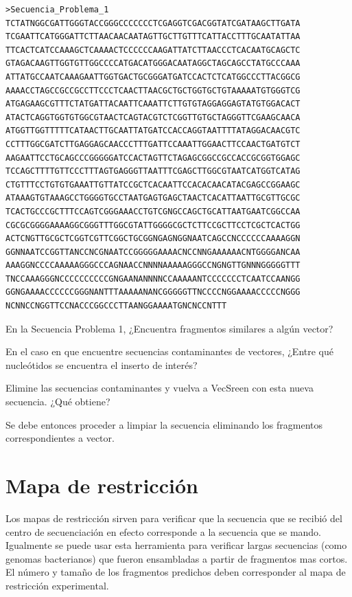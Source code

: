\documentclass[letter,11pt]{book}
\begin{document}
\begin{Verbatim}[commandchars=!\{\},numbers=none,label=Secuencia problema 1,frame=topline,fontsize=\scriptsize]
>Secuencia_Problema_1 
TCTATNGGCGATTGGGTACCGGGCCCCCCCTCGAGGTCGACGGTATCGATAAGCTTGATA
TCGAATTCATGGGATTCTTAACAACAATAGTTGCTTGTTTCATTACCTTTGCAATATTAA
TTCACTCATCCAAAGCTCAAAACTCCCCCCAAGATTATCTTAACCCTCACAATGCAGCTC
GTAGACAAGTTGGTGTTGGCCCCATGACATGGGACAATAGGCTAGCAGCCTATGCCCAAA
ATTATGCCAATCAAAGAATTGGTGACTGCGGGATGATCCACTCTCATGGCCCTTACGGCG
AAAACCTAGCCGCCGCCTTCCCTCAACTTAACGCTGCTGGTGCTGTAAAAATGTGGGTCG
ATGAGAAGCGTTTCTATGATTACAATTCAAATTCTTGTGTAGGAGGAGTATGTGGACACT
ATACTCAGGTGGTGTGGCGTAACTCAGTACGTCTCGGTTGTGCTAGGGTTCGAAGCAACA
ATGGTTGGTTTTTCATAACTTGCAATTATGATCCACCAGGTAATTTTATAGGACAACGTC
CCTTTGGCGATCTTGAGGAGCAACCCTTTGATTCCAAATTGGAACTTCCAACTGATGTCT
AAGAATTCCTGCAGCCCGGGGGATCCACTAGTTCTAGAGCGGCCGCCACCGCGGTGGAGC
TCCAGCTTTTGTTCCCTTTAGTGAGGGTTAATTTCGAGCTTGGCGTAATCATGGTCATAG
CTGTTTCCTGTGTGAAATTGTTATCCGCTCACAATTCCACACAACATACGAGCCGGAAGC
ATAAAGTGTAAAGCCTGGGGTGCCTAATGAGTGAGCTAACTCACATTAATTGCGTTGCGC
TCACTGCCCGCTTTCCAGTCGGGAAACCTGTCGNGCCAGCTGCATTAATGAATCGGCCAA
CGCGCGGGGAAAAGGCGGGTTTGGCGTATTGGGGCGCTCTTCCGCTTCCTCGCTCACTGG
ACTCNGTTGCGCTCGGTCGTTCGGCTGCGGNGAGNGGNAATCAGCCNCCCCCCAAAAGGN
GGNNAATCCGGTTANCCNCGNAATCCGGGGGAAAACNCCNNGAAAAAACNTGGGGANCAA
AAAGGNCCCCAAAAAGGGCCCAGNAACCNNNNAAAAAGGGCCNGNGTTGNNNGGGGGTTT
TNCCAAAGGGNCCCCCCCCCCGNGAANANNNNCCAAAAANTCCCCCCCTCAATCCAANGG
GGNGAAAACCCCCCGGGNANTTTAAAAANANCGGGGGTTNCCCCNGGAAAACCCCCNGGG
NCNNCCNGGTTCCNACCCGGCCCTTAANGGAAAATGNCNCCNTTT
\end{Verbatim} 

{\color{red}
En la Secuencia Problema 1, ¿Encuentra fragmentos similares a algún vector?

En el caso en que encuentre secuencias contaminantes de vectores, ¿Entre qué nucleótidos se encuentra el inserto de interés?

Elimine las secuencias contaminantes y vuelva a VecSreen con esta nueva secuencia. ¿Qué obtiene?
}

Se debe entonces proceder a limpiar la secuencia eliminando los fragmentos correspondientes a vector. 

\section{Mapa de restricción}

Los mapas de restricción sirven para verificar que la secuencia que se recibió del centro de  secuenciación en efecto corresponde a la secuencia que se mando. Igualmente se puede usar esta herramienta para verificar largas secuencias (como genomas bacterianos) que fueron ensambladas a partir de fragmentos mas cortos. El número y tamaño de los fragmentos predichos deben corresponder al mapa de restricción experimental. 
\end{document}
